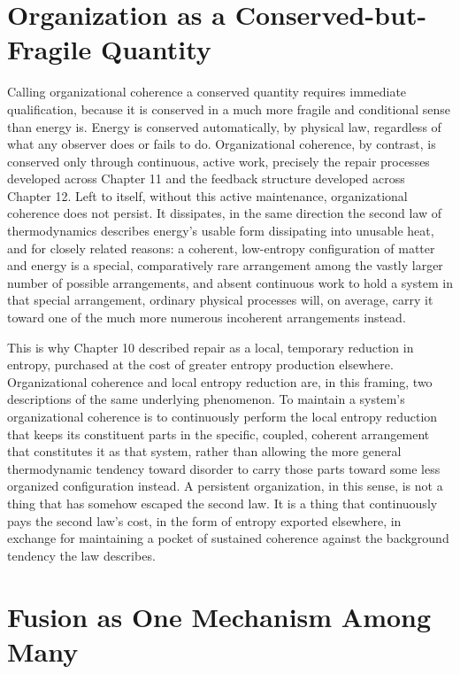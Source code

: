 \section{Organization as a Conserved-but-Fragile Quantity}

Calling organizational coherence a conserved quantity requires immediate qualification, because it is conserved in a much more fragile and conditional sense than energy is. Energy is conserved automatically, by physical law, regardless of what any observer does or fails to do. Organizational coherence, by contrast, is conserved only through continuous, active work, precisely the repair processes developed across Chapter 11 and the feedback structure developed across Chapter 12. Left to itself, without this active maintenance, organizational coherence does not persist. It dissipates, in the same direction the second law of thermodynamics describes energy's usable form dissipating into unusable heat, and for closely related reasons: a coherent, low-entropy configuration of matter and energy is a special, comparatively rare arrangement among the vastly larger number of possible arrangements, and absent continuous work to hold a system in that special arrangement, ordinary physical processes will, on average, carry it toward one of the much more numerous incoherent arrangements instead.

This is why Chapter 10 described repair as a local, temporary reduction in entropy, purchased at the cost of greater entropy production elsewhere. Organizational coherence and local entropy reduction are, in this framing, two descriptions of the same underlying phenomenon. To maintain a system's organizational coherence is to continuously perform the local entropy reduction that keeps its constituent parts in the specific, coupled, coherent arrangement that constitutes it as that system, rather than allowing the more general thermodynamic tendency toward disorder to carry those parts toward some less organized configuration instead. A persistent organization, in this sense, is not a thing that has somehow escaped the second law. It is a thing that continuously pays the second law's cost, in the form of entropy exported elsewhere, in exchange for maintaining a pocket of sustained coherence against the background tendency the law describes.

\section{Fusion as One Mechanism Among Many}

